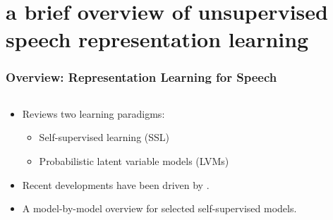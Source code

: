 
\section[A Brief Overview of Unsupervised Speech Representation Learning]{a brief overview of unsupervised speech representation learning}


\begin{frame}
    \frametitle{Overview: Representation Learning for Speech}

    \begin{columns}

        \begin{column}{0.4\textwidth}
            \begin{itemize}
                \item Reviews two learning paradigms:
                \begin{itemize}
                    \item Self-supervised learning (SSL)
                    \item Probabilistic latent variable models (LVMs)
                \end{itemize}
                \item Recent developments have been driven by .
                \item A model-by-model overview for selected self-supervised models.
            \end{itemize}
        \end{column}


\end{columns}
\end{frame}
